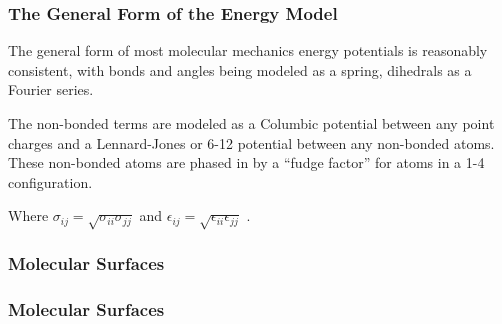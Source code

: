     \subsubsection{The General Form of the Energy Model}
    \label{subsubsection:energy_general_form}
    The general form of most molecular mechanics energy potentials is reasonably consistent, with bonds and angles being modeled as a spring, dihedrals as a Fourier series.
    
    
    
    
    The non-bonded terms are modeled as a Columbic potential between any point charges and a Lennard-Jones or 6-12 potential between any non-bonded atoms.
    These non-bonded atoms are phased in by a ``fudge factor'' for atoms in a 1-4 configuration.
    
    Where $\sigma_{ij} = \sqrt{\sigma_{ii} \sigma_{jj}}$ and $\epsilon_{ij} = \sqrt{\epsilon_{ii}\epsilon_{jj}}$ \cite{jorgensen1996development}.

    \subsubsection{Molecular Surfaces}
    \label{subsubsection:molecular_surfaces}
    

    \subsubsection{Molecular Surfaces}
    \label{subsubsection:molecular_surfaces}
    
